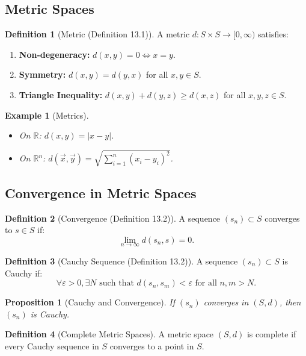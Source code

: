 \documentclass[9pt]{article}
\theoremstyle{definition}
\newtheorem{definition}{Definition}
\theoremstyle{plain}
\newtheorem{proposition}{Proposition}
\newtheorem{example}{Example}
\begin{document}
\subsection*{Metric Spaces}
\begin{definition}[Metric (Definition 13.1)]
A metric \( d : S \times S \to [0, \infty) \) satisfies:
\begin{enumerate}[label=(D\arabic*)]
    \item \textbf{Non-degeneracy:} \( d(x, y) = 0 \iff x = y \).
    \item \textbf{Symmetry:} \( d(x, y) = d(y, x) \) for all \( x, y \in S \).
    \item \textbf{Triangle Inequality:} \( d(x, y) + d(y, z) \geq d(x, z) \) for all \( x, y, z \in S \).
\end{enumerate}
\end{definition}

\begin{example}[Metrics]
\leavevmode
\begin{itemize}
    \item On \( \mathbb{R} \): \( d(x, y) = |x - y| \).
    \item On \( \mathbb{R}^n \): \( d(\vec{x}, \vec{y}) = \sqrt{\sum_{i=1}^n (x_i - y_i)^2} \).
\end{itemize}
\end{example}

\subsection*{Convergence in Metric Spaces}
\begin{definition}[Convergence (Definition 13.2)]
A sequence \( (s_n) \subset S \) converges to \( s \in S \) if:
\[
\lim_{n \to \infty} d(s_n, s) = 0.
\]
\end{definition}

\begin{definition}[Cauchy Sequence (Definition 13.2)]
A sequence \( (s_n) \subset S \) is Cauchy if:
\[
\forall \varepsilon > 0, \exists N \text{ such that } d(s_n, s_m) < \varepsilon \text{ for all } n, m > N.
\]
\end{definition}

\begin{proposition}[Cauchy and Convergence]
If \( (s_n) \) converges in \( (S, d) \), then \( (s_n) \) is Cauchy.
\end{proposition}

\begin{definition}[Complete Metric Spaces]
A metric space \( (S, d) \) is complete if every Cauchy sequence in \( S \) converges to a point in \( S \).
\end{definition}
\end{document}
